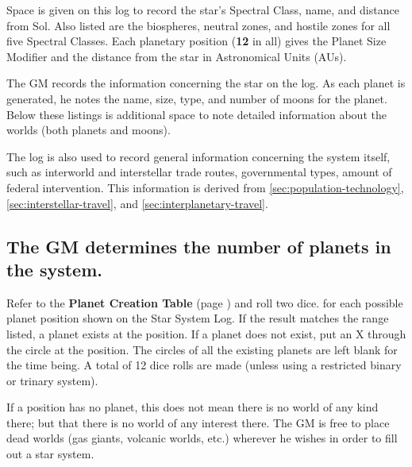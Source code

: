 Space is given on this log to record the star's Spectral Class, name,
and distance from Sol. Also listed are the biospheres, neutral zones,
and hostile zones for all five Spectral Classes. Each planetary
position (\textbf{12} in all) gives the Planet Size Modifier and the distance
from the star in Astronomical Units (AUs).

The GM records the information concerning the star on the log. As each
planet is generated, he notes the name, size, type, and number of
moons for the planet. Below these listings is additional space to note
detailed information about the worlds (both planets and moons).

The log is also used to record general information concerning the
system itself, such as interworld and interstellar trade routes,
governmental types, amount of federal intervention. This information
is derived from \ref{sec:population-technology},
\ref{sec:interstellar-travel}, and \ref{sec:interplanetary-travel}.

\subsection[Planet Creation Table]{The GM determines the number of
  planets in the system.}
\label{sec:planet-creation-table}

Refer to the \textbf{Planet Creation Table} (page
\pageref{tab:planet-creation}) and roll two dice. for each possible
planet position shown on the Star System Log. If the result matches
the range listed, a planet exists at the position. If a planet does
not exist, put an X through the circle at the position. The circles of
all the existing planets are left blank for the time being. A total of
12 dice rolls are made (unless using a restricted binary or trinary
system).

If a position has no planet, this does not mean there is no world of
any kind there; but that there is no world of any interest there. The
GM is free to place dead worlds (gas giants, volcanic worlds, etc.)
wherever he wishes in order to fill out a star system.

